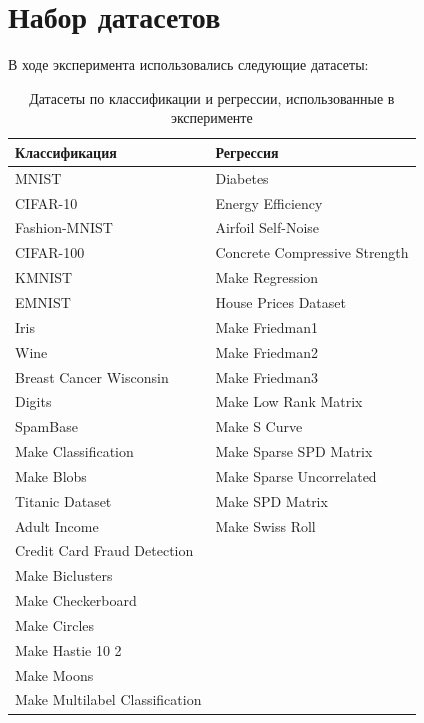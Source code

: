 \documentclass[a4paper,12pt]{article}
\begin{document}
\section{Набор датасетов}
В ходе эксперимента использовались следующие датасеты:
\begin{table}[ht]
  \centering
  \begin{tabular}{|p{}|p{}|}
    \hline
    \textbf{Классификация} & \textbf{Регрессия} \\
    \hline
    MNIST & Diabetes \\
    CIFAR-10 & Energy Efficiency \\
    Fashion-MNIST & Airfoil Self-Noise \\
    CIFAR-100 & Concrete Compressive Strength \\
    KMNIST & Make Regression \\
    EMNIST & House Prices Dataset \\
    Iris & Make Friedman1 \\
    Wine & Make Friedman2 \\
    Breast Cancer Wisconsin & Make Friedman3 \\
    Digits & Make Low Rank Matrix \\
    SpamBase & Make S Curve \\
    Make Classification & Make Sparse SPD Matrix \\
    Make Blobs & Make Sparse Uncorrelated \\
    Titanic Dataset & Make SPD Matrix \\
    Adult Income & Make Swiss Roll \\
    Credit Card Fraud Detection & \\
    Make Biclusters & \\
    Make Checkerboard & \\
    Make Circles & \\
    Make Hastie 10 2 & \\
    Make Moons & \\
    Make Multilabel Classification & \\
    \hline
  \end{tabular}
  \caption{Датасеты по классификации и регрессии, использованные в эксперименте}
\end{table}
\end{document}
